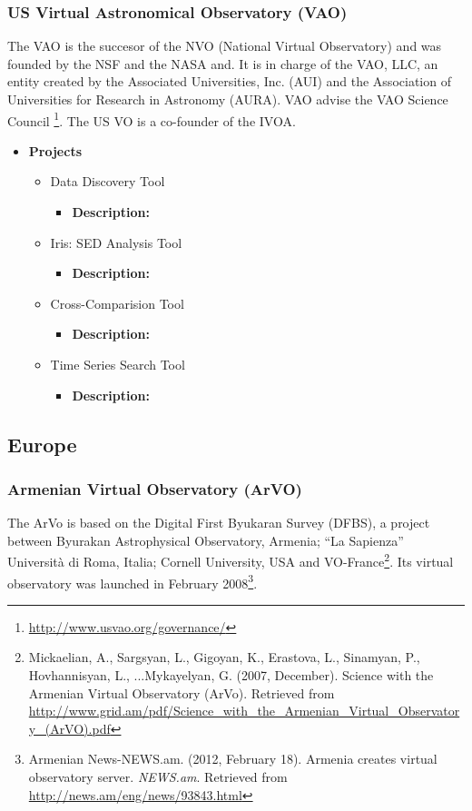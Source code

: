 \subsubsection{US Virtual Astronomical Observatory (VAO)}
The VAO is the succesor of the NVO (National Virtual Observatory) and was
founded by the NSF and the NASA and. It is in charge of the VAO, LLC, an entity
created by the Associated Universities, Inc. (AUI) and the Association of
Universities for Research in Astronomy (AURA). VAO advise the VAO Science
Council \footnote{\url{http://www.usvao.org/governance/}}. The US VO is a
co-founder of the IVOA.

\begin{itemize}
	\item \textbf{Projects}
	\begin{itemize}
		\item Data Discovery Tool
			\begin{itemize}
				\item \textbf{Description:}
			\end{itemize}
		\item Iris: SED Analysis Tool
			\begin{itemize}
				\item \textbf{Description:}
			\end{itemize}
		\item Cross-Comparision Tool
			\begin{itemize}
				\item \textbf{Description:}
			\end{itemize}
		\item Time Series Search Tool
			\begin{itemize}
				\item \textbf{Description:}
			\end{itemize}
	\end{itemize}
\end{itemize}

\subsection{Europe}
\subsubsection{Armenian Virtual Observatory (ArVO)}
The ArVo is based on the Digital First Byukaran Survey (DFBS), a project
between Byurakan Astrophysical Observatory, Armenia; ``La Sapienza''
Universit\`{a} di Roma, Italia; Cornell University, USA and
VO-France\footnote{Mickaelian, A., Sargsyan, L., Gigoyan, K., Erastova, L.,
Sinamyan, P., Hovhannisyan, L., ...Mykayelyan, G. (2007, December). Science
with the Armenian Virtual Observatory (ArVo).  Retrieved from
\url{http://www.grid.am/pdf/Science_with_the_Armenian_Virtual_Observatory_(ArVO).pdf}}.
Its virtual observatory was launched in February 2008\footnote{Armenian
News-NEWS.am. (2012, February 18). Armenia creates virtual observatory server.
\textit{NEWS.am}. Retrieved from \url{http://news.am/eng/news/93843.html}}.

